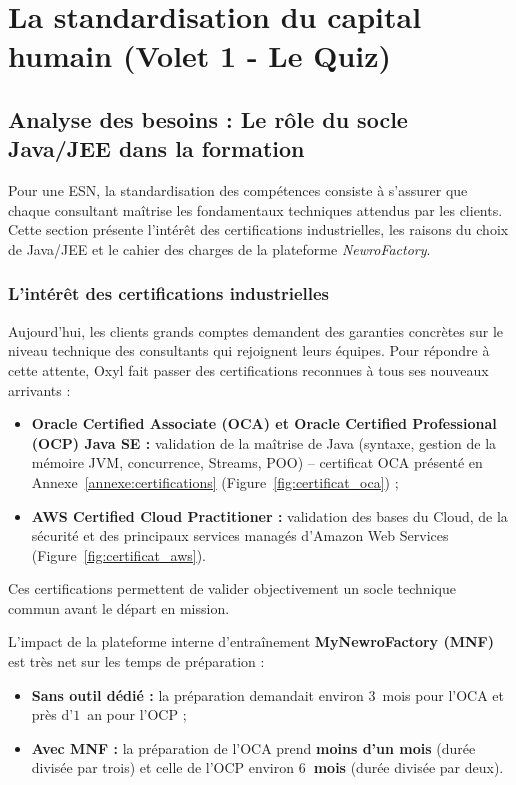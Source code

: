 \documentclass{tnreport}
\begin{document}
\chapter{La standardisation du capital humain (Volet 1 - Le Quiz)}
\label{chap:quiz}

\section{Analyse des besoins : Le rôle du socle Java/JEE dans la formation}
\label{sec:analyse_besoins}

Pour une ESN, la standardisation des compétences consiste à s'assurer que chaque consultant maîtrise les fondamentaux techniques attendus par les clients. Cette section présente l'intérêt des certifications industrielles, les raisons du choix de Java/JEE et le cahier des charges de la plateforme \textit{NewroFactory}.

\subsection{L'intérêt des certifications industrielles}
\label{subsec:evolution_marche_certifications}

Aujourd'hui, les clients grands comptes demandent des garanties concrètes sur le niveau technique des consultants qui rejoignent leurs équipes. Pour répondre à cette attente, Oxyl fait passer des certifications reconnues à tous ses nouveaux arrivants :
\begin{itemize}
    \item \textbf{Oracle Certified Associate (OCA) et Oracle Certified Professional (OCP) Java SE :} validation de la maîtrise de Java (syntaxe, gestion de la mémoire JVM, concurrence, Streams, POO) -- certificat OCA présenté en Annexe~\ref{annexe:certifications} (Figure~\ref{fig:certificat_oca}) ;
    \item \textbf{AWS Certified Cloud Practitioner :} validation des bases du Cloud, de la sécurité et des principaux services managés d'Amazon Web Services (Figure~\ref{fig:certificat_aws}).
\end{itemize}

Ces certifications permettent de valider objectivement un socle technique commun avant le départ en mission.

L'impact de la plateforme interne d'entraînement \textbf{MyNewroFactory (MNF)} est très net sur les temps de préparation :
\begin{itemize}
    \item \textbf{Sans outil dédié :} la préparation demandait environ $3$~mois pour l'OCA et près d'$1$~an pour l'OCP ;
    \item \textbf{Avec MNF :} la préparation de l'OCA prend \textbf{moins d'un mois} (durée divisée par trois) et celle de l'OCP environ \textbf{$6$~mois} (durée divisée par deux).
\end{itemize}
\end{document}
